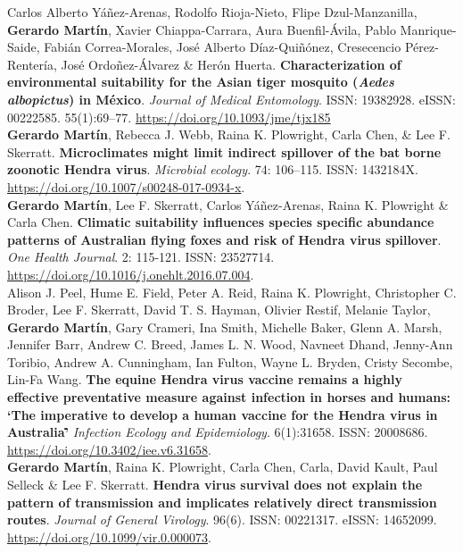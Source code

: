 \documentclass[11pt, letter]{article}
\newcommand{\years}[1]{\marginnote{\scriptsize #1}}
\begin{document}
\years{2017} Carlos Alberto Y\'a\~nez-Arenas, Rodolfo Rioja-Nieto, Flipe Dzul-Manzanilla, \textbf{Gerardo Mart\'in}, Xavier Chiappa-Carrara, Aura Buenfil-\'Avila, Pablo Manrique-Saide, Fabi\'an Correa-Morales, Jos\'e Alberto D\'iaz-Qui\~n\'onez, Cresecencio P\'erez-Renter\'ia, Jos\'e Ordo\~nez-\'Alvarez \& Her\'on Huerta. \textbf{Characterization of environmental suitability for the Asian tiger mosquito (\emph{Aedes albopictus}) in M\'exico}. \emph{Journal of Medical Entomology}. ISSN: 19382928. eISSN: 00222585. 55(1):69–77. \url{https://doi.org/10.1093/jme/tjx185}\\

\years{2017} \textbf{Gerardo Mart\'in}, Rebecca J. Webb, Raina K. Plowright, Carla Chen, \& Lee F. Skerratt. \textbf{Microclimates might limit indirect spillover of the bat borne zoonotic Hendra virus}. \emph{Microbial ecology}. 74: 106–115. ISSN: 1432184X. \url{https://doi.org/10.1007/s00248-017-0934-x}.\\

\years{2016} \textbf{Gerardo Mart\'in}, Lee F. Skerratt, Carlos Y\'a\~nez-Arenas, Raina K. Plowright \& Carla Chen. \textbf{Climatic suitability influences species specific abundance patterns of Australian flying foxes and risk of Hendra virus spillover}. \emph{One Health Journal}. 2: 115-121. ISSN: 23527714. \url{https://doi.org/10.1016/j.onehlt.2016.07.004}.\\

\years{2016} Alison J. Peel, Hume E. Field, Peter A. Reid, Raina K. Plowright, Christopher C. Broder, Lee F. Skerratt, David T. S. Hayman, Olivier Restif, Melanie Taylor, \textbf{Gerardo Mart\'in}, Gary Crameri, Ina Smith, Michelle Baker, Glenn A. Marsh, Jennifer Barr, Andrew C. Breed, James L. N. Wood, Navneet Dhand, Jenny-Ann Toribio, Andrew A. Cunningham, Ian Fulton, Wayne L. Bryden, Cristy Secombe, Lin-Fa Wang. \textbf{The equine Hendra virus vaccine remains a highly effective preventative measure against infection in horses and humans: \lq The imperative to develop a human vaccine for the Hendra virus in Australia\rq\.} \emph{Infection Ecology and Epidemiology}. 6(1):31658. ISSN: 20008686. \url{https://doi.org/10.3402/iee.v6.31658}.\\

\years{2015} \textbf{Gerardo Mart\'in}, Raina K. Plowright, Carla Chen, Carla, David Kault, Paul Selleck \& Lee F. Skerratt. \textbf{Hendra virus survival does not explain the pattern of transmission and implicates relatively direct transmission routes}. \emph{Journal of General Virology}. 96(6). ISSN: 00221317. eISSN: 14652099. \url{https://doi.org/10.1099/vir.0.000073}.\\
\end{document}
